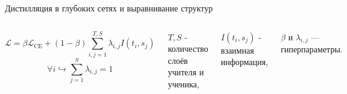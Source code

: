 \documentclass{beamer}
\begin{document}
\begin{frame}{Дистилляция в глубоких сетях и выравнивание структур}
    \begin{columns}[c]
        \begin{equation}
            \mathcal{L} = \beta \mathcal{L}_\text{CE} + (1 - \beta){\sum_{i, j=1}^{T, S}\lambda_{i, j}I(t_{i}, s_{j})}
        \end{equation}
        \vspace*{-\baselineskip}\setlength\belowdisplayshortskip{0pt}
        \begin{equation}
            \forall i \hookrightarrow  \sum_{j=1}^{S}\lambda_{i, j} = 1
        \end{equation}

        $T, S$ - количество слоёв учителя и ученика,

        $I(t_{i}, s_{j})$ - взаимная информация,

        $\beta$ и $\lambda_{i, j}$ --- гиперпараметры.
    \end{columns}

\end{frame}
\end{document}
